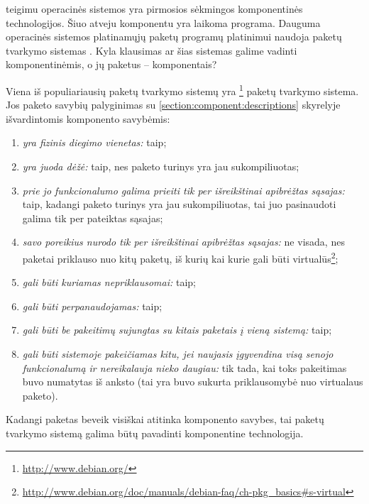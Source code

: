 
\cite[12]{cs-beyond-object-oriented-programming} teigimu operacinės
sistemos yra pirmosios sėkmingos komponentinės technologijos. Šiuo
atveju komponentu yra laikoma programa. Dauguma 
operacinės sistemos platinamųjų paketų  programų
platinimui naudoja paketų tvarkymo sistemas . Kyla klausimas ar šias sistemas galime vadinti komponentinėmis,
o jų paketus – komponentais?

Viena iš populiariausių paketų tvarkymo sistemų yra
\footnote{\url{http://www.debian.org/}} paketų
tvarkymo sistema. Jos paketo savybių palyginimas su
\ref{section:component:descriptions} skyrelyje išvardintomis
komponento savybėmis:
\begin{enumerate}
  \item \emph{yra fizinis diegimo vienetas:} taip;
  \item \emph{yra juoda dėžė:} taip, nes paketo turinys yra jau
    sukompiliuotas;
  \item \emph{prie jo funkcionalumo galima prieiti tik per
    išreikštinai apibrėžtas sąsajas:} taip, kadangi paketo turinys
    yra jau sukompiliuotas, tai juo pasinaudoti galima tik per
    pateiktas sąsajas;
  \item \emph{savo poreikius nurodo tik per išreikštinai apibrėžtas
    sąsajas:} ne visada, nes  paketai priklauso nuo
    kitų paketų, iš kurių kai kurie gali būti virtualūs\footnote{
    \url{http://www.debian.org/doc/manuals/debian-faq/ch-pkg_basics\#s-virtual}};
  \item \emph{gali būti kuriamas nepriklausomai:} taip;
  \item \emph{gali būti perpanaudojamas:} taip;
  \item \emph{gali būti be pakeitimų sujungtas su kitais paketais
    į vieną sistemą:} taip;
  \item \emph{gali būti sistemoje pakeičiamas kitu, jei naujasis
    įgyvendina visą senojo funkcionalumą ir nereikalauja nieko
    daugiau:} tik tada, kai toks pakeitimas buvo numatytas iš anksto
    (tai yra buvo sukurta priklausomybė nuo virtualaus paketo).
\end{enumerate}
Kadangi  paketas beveik visiškai atitinka komponento
savybes, tai  paketų tvarkymo sistemą galima
būtų pavadinti komponentine technologija.

